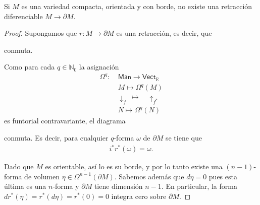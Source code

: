 \documentclass[11pt]{article}
\newcommand{\N}{\mathbb{N}}
\newcommand{\R}{\mathbb{R}}
\newcommand{\paint}[1]{\color{color}{#1}}
\newenvironment{exercise}[2][Ejercicio]{\begin{trivlist}
\item[\hskip \labelsep \paint{{\bfseries #1}}\hskip \labelsep {\bfseries #2.}]}{\end{trivlist}}
\begin{document}
\begin{exercise}{7} Si $M$ es una variedad compacta, orientada y con borde, no existe una retracción diferenciable $M \to \partial M$.
\end{exercise}
\begin{proof} Supongamos que $r : M \to \partial M$ es una retracción, es decir, que
\begin{center}
\end{center}
conmuta. 

Como para cada $q \in \N_0$ la asignación
\begin{align*}
\Omega^q : \ &\mathsf{Man} \longrightarrow \mathsf{Vect}_\R\\
&M \longmapsto \Omega^q(M)\\
&\downarrow_{f} \ \longmapsto \quad \uparrow_{f^*}\\
&N \longmapsto \Omega^q(N)
\end{align*}
es funtorial contravariante, el diagrama
\begin{center}
\end{center}
conmuta. Es decir, para cualquier $q$-forma $\omega$ de $\partial M$ se tiene que \begin{align}
i^*r^*(\omega) = \omega.
\end{align}

Dado que $M$ es orientable, así lo es su borde, y por lo tanto existe una $(n-1)$-forma de volumen $\eta \in \Omega^{n-1}(\partial M)$. Sabemos además que $d\eta = 0$ pues esta última es una $n$-forma y $\partial M$ tiene dimensión $n-1$. En particular, la forma $dr^*(\eta) = r^*(d\eta) = r^*(0) = 0$ integra cero sobre $\partial M$. 


\end{proof}
\end{document}
